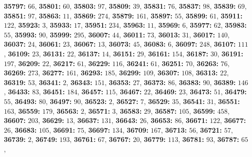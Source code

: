 \textsf{\bfseries 35797:} $66$, \textsf{\bfseries 35801:} $60$, \textsf{\bfseries 35803:} $97$, \textsf{\bfseries 35809:} $39$, \textsf{\bfseries 35831:} $76$, \textsf{\bfseries 35837:} $98$, \textsf{\bfseries 35839:} $69$, \textsf{\bfseries 35851:} $97$, \textsf{\bfseries 35863:} $11$, \textsf{\bfseries 35869:} $274$, \textsf{\bfseries 35879:} $161$, \textsf{\bfseries 35897:} $55$, \textsf{\bfseries 35899:} $61$, \textsf{\bfseries 35911:} $122$, \textsf{\bfseries 35923:} $3$, \textsf{\bfseries 35933:} $17$, \textsf{\bfseries 35951:} $234$, \textsf{\bfseries 35963:} $11$, \textsf{\bfseries 35969:} $6$, \textsf{\bfseries 35977:} $62$, \textsf{\bfseries 35983:} $55$, \textsf{\bfseries 35993:} $90$, \textsf{\bfseries 35999:} $295$, \textsf{\bfseries 36007:} $44$, \textsf{\bfseries 36011:} $73$, \textsf{\bfseries 36013:} $31$, \textsf{\bfseries 36017:} $140$, \textsf{\bfseries 36037:} $24$, \textsf{\bfseries 36061:} $23$, \textsf{\bfseries 36067:} $13$, \textsf{\bfseries 36073:} $45$, \textsf{\bfseries 36083:} $6$, \textsf{\bfseries 36097:} $248$, \textsf{\bfseries 36107:} $111$, \textsf{\bfseries 36109:} $23$, \textsf{\bfseries 36131:} $22$, \textsf{\bfseries 36137:} $14$, \textsf{\bfseries 36151:} $29$, \textsf{\bfseries 36161:} $154$, \textsf{\bfseries 36187:} $30$, \textsf{\bfseries 36191:} $197$, \textsf{\bfseries 36209:} $22$, \textsf{\bfseries 36217:} $61$, \textsf{\bfseries 36229:} $116$, \textsf{\bfseries 36241:} $61$, \textsf{\bfseries 36251:} $70$, \textsf{\bfseries 36263:} $76$, \textsf{\bfseries 36269:} $273$, \textsf{\bfseries 36277:} $161$, \textsf{\bfseries 36293:} $185$, \textsf{\bfseries 36299:} $109$, \textsf{\bfseries 36307:} $108$, \textsf{\bfseries 36313:} $22$, \textsf{\bfseries 36319:} $53$, \textsf{\bfseries 36341:} $2$, \textsf{\bfseries 36343:} $151$, \textsf{\bfseries 36353:} $27$, \textsf{\bfseries 36373:} $86$, \textsf{\bfseries 36383:} $90$, \textsf{\bfseries 36389:} $146$, \textsf{\bfseries 36433:} $83$, \textsf{\bfseries 36451:} $184$, \textsf{\bfseries 36457:} $115$, \textsf{\bfseries 36467:} $22$, \textsf{\bfseries 36469:} $23$, \textsf{\bfseries 36473:} $51$, \textsf{\bfseries 36479:} $55$, \textsf{\bfseries 36493:} $80$, \textsf{\bfseries 36497:} $90$, \textsf{\bfseries 36523:} $2$, \textsf{\bfseries 36527:} $7$, \textsf{\bfseries 36529:} $35$, \textsf{\bfseries 36541:} $31$, \textsf{\bfseries 36551:} $163$, \textsf{\bfseries 36559:} $179$, \textsf{\bfseries 36563:} $2$, \textsf{\bfseries 36571:} $3$, \textsf{\bfseries 36583:} $29$, \textsf{\bfseries 36587:} $105$, \textsf{\bfseries 36599:} $458$, \textsf{\bfseries 36607:} $203$, \textsf{\bfseries 36629:} $13$, \textsf{\bfseries 36637:} $131$, \textsf{\bfseries 36643:} $26$, \textsf{\bfseries 36653:} $86$, \textsf{\bfseries 36671:} $122$, \textsf{\bfseries 36677:} $26$, \textsf{\bfseries 36683:} $105$, \textsf{\bfseries 36691:} $75$, \textsf{\bfseries 36697:} $134$, \textsf{\bfseries 36709:} $167$, \textsf{\bfseries 36713:} $56$, \textsf{\bfseries 36721:} $57$, \textsf{\bfseries 36739:} $2$, \textsf{\bfseries 36749:} $193$, \textsf{\bfseries 36761:} $67$, \textsf{\bfseries 36767:} $20$, \textsf{\bfseries 36779:} $113$, \textsf{\bfseries 36781:} $93$, \textsf{\bfseries 36787:} $65$, 
